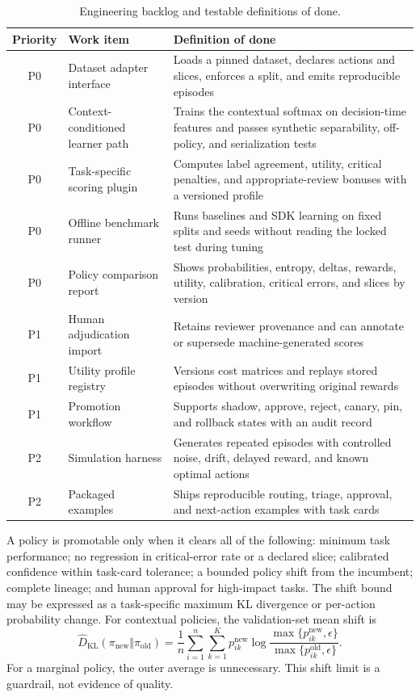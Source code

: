 \documentclass[conference]{IEEEtran}
\begin{document}
\begin{table}[t]
\centering
\caption{Engineering backlog and testable definitions of done.}
\label{tab:backlog}
\renewcommand{\arraystretch}{1.16}
\begin{tabular}{@{}cp{4.1cm}p{10.3cm}@{}}
\toprule
\textbf{Priority} & \textbf{Work item} & \textbf{Definition of done} \\
\midrule
P0 & Dataset adapter interface & Loads a pinned dataset, declares actions and slices, enforces a split, and emits reproducible episodes \\
P0 & Context-conditioned learner path & Trains the contextual softmax on decision-time features and passes synthetic separability, off-policy, and serialization tests \\
P0 & Task-specific scoring plugin & Computes label agreement, utility, critical penalties, and appropriate-review bonuses with a versioned profile \\
P0 & Offline benchmark runner & Runs baselines and SDK learning on fixed splits and seeds without reading the locked test during tuning \\
P0 & Policy comparison report & Shows probabilities, entropy, deltas, rewards, utility, calibration, critical errors, and slices by version \\
P1 & Human adjudication import & Retains reviewer provenance and can annotate or supersede machine-generated scores \\
P1 & Utility profile registry & Versions cost matrices and replays stored episodes without overwriting original rewards \\
P1 & Promotion workflow & Supports shadow, approve, reject, canary, pin, and rollback states with an audit record \\
P2 & Simulation harness & Generates repeated episodes with controlled noise, drift, delayed reward, and known optimal actions \\
P2 & Packaged examples & Ships reproducible routing, triage, approval, and next-action examples with task cards \\
\bottomrule
\end{tabular}
\end{table}

A policy is promotable only when it clears all of the following:
minimum task performance; no regression in critical-error rate or a
declared slice; calibrated confidence within task-card tolerance; a
bounded policy shift from the incumbent; complete lineage; and human
approval for high-impact tasks. The shift bound may be expressed as a
task-specific maximum KL divergence or per-action probability change.
For contextual policies, the validation-set mean shift is
\begin{equation}
\widehat{D}_{\mathrm{KL}}(\pi_{\mathrm{new}}\Vert\pi_{\mathrm{old}})
=\frac{1}{n}\sum_{i=1}^{n}\sum_{k=1}^{K}
p^{\mathrm{new}}_{ik}\log
\frac{\max\{p^{\mathrm{new}}_{ik},\epsilon\}}
{\max\{p^{\mathrm{old}}_{ik},\epsilon\}}.
\label{eq:policy-shift}
\end{equation}
For a marginal policy, the outer average is unnecessary. This shift
limit is a guardrail, not evidence of quality.
\end{document}
